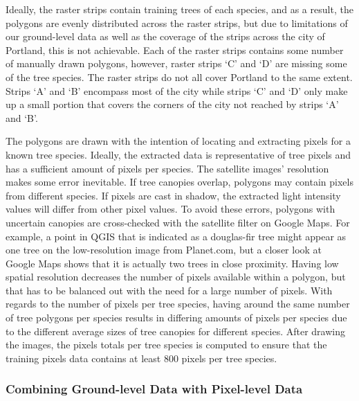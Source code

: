 \documentclass[12pt,twoside]{reedthesis}
\begin{document}
Ideally, the raster strips contain training trees of each species, and as a result, the polygons are evenly distributed across the raster strips, but due to limitations of our ground-level data as well as the coverage of the strips across the city of Portland, this is not achievable. Each of the raster strips contains some number of manually drawn polygons, however, raster strips `C' and `D' are missing some of the tree species. The raster strips do not all cover Portland to the same extent. Strips `A' and `B' encompass most of the city while strips `C' and `D' only make up a small portion that covers the corners of the city not reached by strips `A' and `B'.

The polygons are drawn with the intention of locating and extracting pixels for a known tree species. Ideally, the extracted data is representative of tree pixels and has a sufficient amount of pixels per species. The satellite images' resolution makes some error inevitable. If tree canopies overlap, polygons may contain pixels from different species. If pixels are cast in shadow, the extracted light intensity values will differ from other pixel values. To avoid these errors, polygons with uncertain canopies are cross-checked with the satellite filter on Google Maps. For example, a point in QGIS that is indicated as a douglas-fir tree might appear as one tree on the low-resolution image from Planet.com, but a closer look at Google Maps shows that it is actually two trees in close proximity. Having low spatial resolution decreases the number of pixels available within a polygon, but that has to be balanced out with the need for a large number of pixels. With regards to the number of pixels per tree species, having around the same number of tree polygons per species results in differing amounts of pixels per species due to the different average sizes of tree canopies for different species. After drawing the images, the pixels totals per tree species is computed to ensure that the training pixels data contains at least 800 pixels per tree species.

\hypertarget{combining-ground-level-data-with-pixel-level-data}{%
\subsubsection{Combining Ground-level Data with Pixel-level Data}\label{combining-ground-level-data-with-pixel-level-data}}
\end{document}
